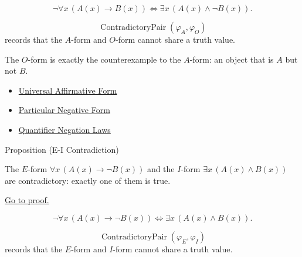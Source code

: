 \begin{remark*}
\[
\neg\forall x\,(A(x)\to B(x))
\Longleftrightarrow
\exists x\,(A(x)\land \neg B(x)).
\]
\end{remark*}

\begin{remark*}
\[
  \operatorname{ContradictoryPair}(\varphi_A,\varphi_O)
\] records that the
\(A\)-form and \(O\)-form cannot share a truth value.
\end{remark*}

\begin{remark*}[Interpretation]
The \(O\)-form is exactly the counterexample to the \(A\)-form: an object that
is \(A\) but not \(B\).
\end{remark*}

\begin{dependencies}
\begin{itemize}
  \item \hyperref[def:categorical-a-form-predicate-logic]{Universal Affirmative Form}
  \item \hyperref[def:categorical-o-form-predicate-logic]{Particular Negative Form}
  \item \hyperref[thm:qneg]{Quantifier Negation Laws}
\end{itemize}
\end{dependencies}

\begin{propositionbox}{Proposition (E-I Contradiction)}
\begin{proposition}[E-I Contradiction]
\label{prop:e-i-contradictory-predicate-logic}
The \(E\)-form \(\forall x\,(A(x)\to \neg B(x))\) and the \(I\)-form
\(\exists x\,(A(x)\land B(x))\) are contradictory: exactly one of them is true.

\noindent\hyperref[prf:e-i-contradictory-predicate-logic]{Go to proof.}
\end{proposition}
\end{propositionbox}

\begin{remark*}
\[
\neg\forall x\,(A(x)\to \neg B(x))
\Longleftrightarrow
\exists x\,(A(x)\land B(x)).
\]
\end{remark*}

\begin{remark*}
\[
  \operatorname{ContradictoryPair}(\varphi_E,\varphi_I)
\] records that the
\(E\)-form and \(I\)-form cannot share a truth value.
\end{remark*}

